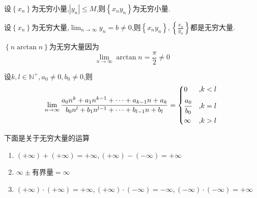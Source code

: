 \begin{formal}
    \begin{theorem}[无穷小量与有界量]\label{thm:无穷小量与有界量}
        设$\left\{x_n\right\}$为无穷小量,$\left|y_n\right|\leqslant M$,则$\left\{x_ny_n\right\}$为无穷小量.
    \end{theorem}
\end{formal}
\begin{formal}
    \begin{theorem}[无穷大量与有界量]\label{thm:无穷大量与有界量}
        设$\left\{x_n\right\}$为无穷大量,$\displaystyle\lim_{n\to\infty}y_n=b\neq 0$,则$\displaystyle\left\{x_ny_n\right\},\left\{\frac{x_n}{y_n}\right\}$都是无穷大量.
    \end{theorem}
\end{formal}
\begin{brown}
    \begin{example}
        $\left\{n\arctan n\right\}$为无穷大量因为\[
        \lim_{n\to\infty}\arctan n=\frac{\pi}{2}\neq 0
        \]
    \end{example}
\end{brown}
\begin{brown}
    \begin{example}
        设$k,l\in\mathbb{N}^+,a_0\neq 0,b_0\neq0$,则\[
        \lim_{n\to\infty}\frac{
            a_0n^k+a_1n^{k-1}+\cdots+a_{k-1}n+a_k
        }{
            b_0n^l+b_1n^{l-1}+\cdots+b_{l-1}n+b_l
        }=\begin{cases*}
            0&,$k<l$\\
            \cfrac{a_0}{b_0}&,$k=l$\\
            \infty&,$k>l$
        \end{cases*}
        \]
    \end{example}
\end{brown}
\begin{formal}
    \begin{proposition}[无穷大的运算]\label{prop:无穷大的运算}下面是关于无穷大量的运算

        \begin{enumerate}[label={\textup{(\arabic*)}}]
            \item $\left(+\infty\right)+\left(+\infty\right)=+\infty,\left(+\infty\right)-\left(-\infty\right)=+\infty$
            \item $\infty\pm$有界量$=\infty$
            \item $\left(+\infty\right)\cdot\left(+\infty\right)=+\infty,\left(+\infty\right)\cdot\left(-\infty\right)=-\infty,\left(-\infty\right)\cdot\left(-\infty\right)=+\infty$
        \end{enumerate}
    \end{proposition}
\end{formal}
